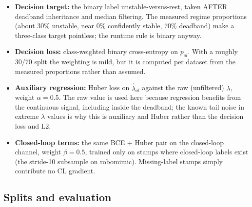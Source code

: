 \documentclass[11pt]{article}
\begin{document}
\begin{itemize}[leftmargin=2em]
  \item \textbf{Decision target:} the binary label unstable-versus-rest, taken
        AFTER deadband inheritance and median filtering. The measured regime
        proportions (about 30\% unstable, near 0\% confidently stable, 70\%
        deadband) make a three-class target pointless; the runtime rule is binary
        anyway.
  \item \textbf{Decision loss:} class-weighted binary cross-entropy on $p_{ol}$.
        With a roughly 30/70 split the weighting is mild, but it is computed per
        dataset from the measured proportions rather than assumed.
  \item \textbf{Auxiliary regression:} Huber loss on $\hat\lambda_{ol}$ against the
        raw (unfiltered) $\lambda$, weight $\alpha = 0.5$. The raw value is used
        here because regression benefits from the continuous signal, including
        inside the deadband; the known tail noise in extreme $\lambda$ values is
        why this is auxiliary and Huber rather than the decision loss and L2.
  \item \textbf{Closed-loop terms:} the same BCE + Huber pair on the closed-loop
        channel, weight $\beta = 0.5$, trained only on stamps where closed-loop
        labels exist (the stride-10 subsample on robomimic). Missing-label stamps
        simply contribute no CL gradient.
\end{itemize}

\subsection{Splits and evaluation}
\end{document}
